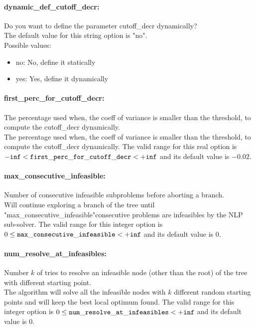 \paragraph{dynamic\_def\_cutoff\_decr:}\label{sec:dynamic_def_cutoff_decr} Do you want to define the parameter cutoff\_decr dynamically? $\;$ \\

The default value for this string option is "no".
\\ 
Possible values:
\begin{itemize}
   \item no: No, define it statically
   \item yes: Yes, define it dynamically
\end{itemize}

\paragraph{first\_perc\_for\_cutoff\_decr:}\label{sec:first_perc_for_cutoff_decr} The percentage used when, the coeff of variance is smaller than the threshold, to compute the cutoff\_decr dynamically. $\;$ \\
 The percentage used when, the coeff of variance
is smaller than the threshold, to compute the
cutoff\_decr dynamically. The valid range for this real option is 
${\tt -inf} <  {\tt first\_perc\_for\_cutoff\_decr } <  {\tt +inf}$
and its default value is $-0.02$.


\paragraph{max\_consecutive\_infeasible:}\label{sec:max_consecutive_infeasible} Number of consecutive infeasible subproblems before aborting a branch. $\;$ \\
 Will continue exploring a branch of the tree
until "max\_consecutive\_infeasible"consecutive
problems are infeasibles by the NLP sub-solver. The valid range for this integer option is
$0 \le {\tt max\_consecutive\_infeasible } <  {\tt +inf}$
and its default value is $0$.


\paragraph{num\_resolve\_at\_infeasibles:}\label{sec:num_resolve_at_infeasibles} Number $k$ of tries to resolve an infeasible node (other than the root) of the tree with different starting point. $\;$ \\
 The algorithm will solve all the infeasible nodes
with $k$ different random starting points and
will keep the best local optimum found. The valid range for this integer option is
$0 \le {\tt num\_resolve\_at\_infeasibles } <  {\tt +inf}$
and its default value is $0$.



